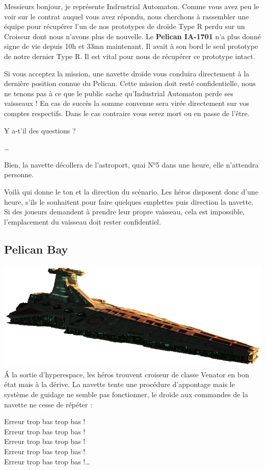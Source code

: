 \begin{quotebox}
	Messieurs bonjour, je représente Indrustrial Automaton.
	Comme vous avez peu le voir sur le contrat auquel vous avez répondu, nous cherchons à rassembler une équipe pour récupérer l’un de nos prototypes de droïde Type R perdu sur un Croiseur dont nous n’avons plus de nouvelle.
	Le \textbf{Pelican IA-1701} n’a plus donné signe de vie depuis 10h et 33mn maintenant. Il avait à son bord le seul prototype de notre dernier Type R. Il est vital pour nous de récupérer ce prototype intact.

	Si vous acceptez la mission, une navette droïde vous conduira directement à la dernière position connue du Pelican. Cette mission doit resté confidentielle, nous ne tenons pas à ce que le public sache qu’Industrial Automaton perde ses vaisseaux !
	En cas de succès la somme convenue sera virée directement sur vos comptes respectifs. Dans le cas contraire vous serez mort ou en passe de l’être.

	Y a-t’il des questions ?

	\ldots

	Bien, la navette décollera de l’astroport, quai N°5 dans une heure, elle n’attendra personne.
\end{quotebox}

Voilà qui donne le ton et la direction du scénario. Les héros disposent donc d’une heure, s’ils le souhaitent pour faire quelques emplettes puis direction la navette. Si des joueurs demandent à prendre leur propre vaisseau, cela est impossible, l'emplacement du vaisseau doit rester confidentiel.

\subsection{Pelican Bay}
\includegraphics[width=\linewidth]{_img/venator.png}
\'A la sortie d’hyperespace, les héros trouvent croiseur de classe Venator en bon état mais à la dérive. La navette tente une procédure d’appontage mais le système de guidage ne semble pas fonctionner, le droïde aux commandes de la navette ne cesse de répéter :
\begin{quotebox}
	Erreur trop bas trop bas !\\
	Erreur trop bas trop bas !\\
	Erreur trop bas trop bas !\\
	Erreur trop bas trop bas !\\
	Erreur trop bas trop bas !\ldots
\end{quotebox}

